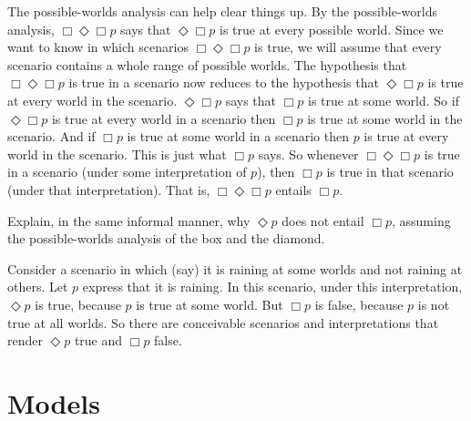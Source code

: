 The possible-worlds analysis can help clear things up. By the possible-worlds
analysis, $\Box \Diamond \Box p$ says that $\Diamond \Box p$ is true at every
possible world. Since we want to know in which scenarios $\Box \Diamond\Box p$
is true, we will assume that every scenario contains a whole range of possible
worlds. The hypothesis that $\Box \Diamond \Box p$ is true in a scenario now
reduces to the hypothesis that $\Diamond \Box p$ is true at every world in the
scenario. $\Diamond\Box p$ says that $\Box p$ is true at some world. So if
$\Diamond\Box p$ is true at every world in a scenario then $\Box p$ is true at
some world in the scenario. And if $\Box p$ is true at some world in a scenario
then $p$ is true at every world in the scenario. This is just what $\Box p$
says. So whenever $\Box \Diamond\Box p$ is true in a scenario (under some
interpretation of $p$), then $\Box p$ is true in that scenario (under that
interpretation). That is, $\Box\Diamond\Box p$ entails $\Box p$.

\begin{exercise}
  Explain, in the same informal manner, why $\Diamond p$ does not entail
  $\Box p$, assuming the possible-worlds analysis of the box and the diamond.
\end{exercise}
\begin{solution}
  Consider a scenario in which (say) it is raining at some worlds and not
  raining at others. Let $p$ express that it is raining. In this scenario, under
  this interpretation, $\Diamond p$ is true, because $p$ is true at some world.
  But $\Box p$ is false, because $p$ is not true at all worlds. So there are conceivable scenarios and interpretations that render $\Diamond p$ true and $\Box p$ false.
\end{solution}


\section{Models}
\label{sec:basicmodels}

